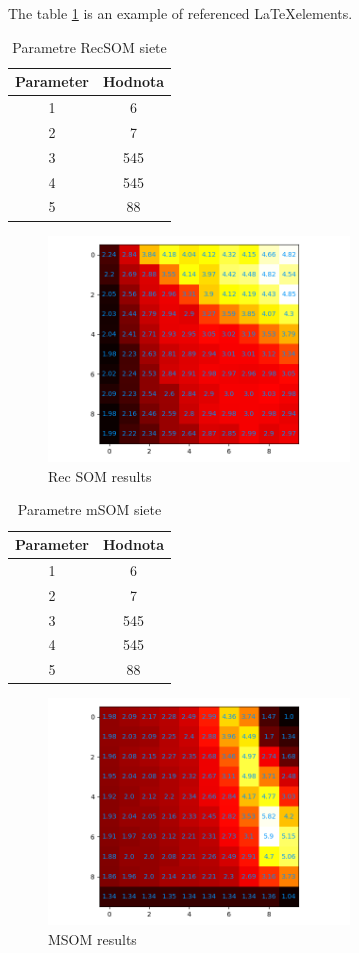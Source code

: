 The table \ref{table:1} is an example of referenced \LaTeX elements.
 
\begin{table}[h!]
\centering
\begin{tabular}{|c|c|} 
 \hline
 Parameter & Hodnota \\ 
 \hline\hline
 1 & 6  \\ 
 \hline
 2 & 7   \\
 \hline
 3 & 545  \\
 \hline
 4 & 545  \\
 \hline
 5 & 88 \\  
 \hline
\end{tabular}
\caption{Parametre RecSOM siete}
\label{table:1}
\end{table}


\begin{figure}[H]
    \centering
    \includegraphics[width=8cm]{assets/recsom_abcd}
    \caption{Rec SOM results}
\end{figure}


\begin{table}[h!]
    \centering
    \begin{tabular}{|c|c|} 
     \hline
     Parameter & Hodnota \\ 
     \hline\hline
     1 & 6  \\ 
     \hline
     2 & 7   \\
     \hline
     3 & 545  \\
     \hline
     4 & 545  \\
     \hline
     5 & 88 \\  
     \hline
    \end{tabular}
    \caption{Parametre mSOM siete}
    \label{table:2}
\end{table}

\begin{figure}[H]
    \centering
    \includegraphics[width=8cm]{assets/msom_abcd}
    \caption{MSOM results}
\end{figure}


